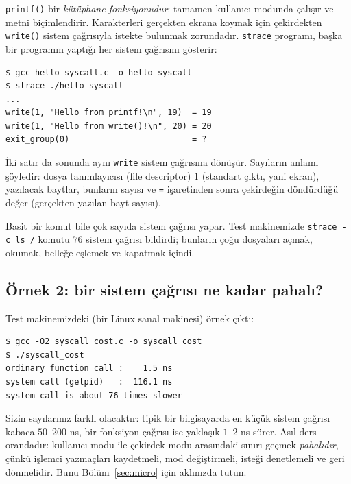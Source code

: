 \documentclass[11pt,a4paper]{article}
\newcommand{\cmd}[1]{\texttt{#1}}
\begin{document}


\cmd{printf()} bir \emph{kütüphane fonksiyonudur}: tamamen kullanıcı modunda çalışır ve metni biçimlendirir. Karakterleri gerçekten ekrana koymak için çekirdekten \cmd{write()} sistem çağrısıyla istekte bulunmak zorundadır. \cmd{strace} programı, başka bir programın yaptığı her sistem çağrısını gösterir:

\begin{lstlisting}[style=term]
$ gcc hello_syscall.c -o hello_syscall
$ strace ./hello_syscall
...
write(1, "Hello from printf!\n", 19)  = 19
write(1, "Hello from write()!\n", 20) = 20
exit_group(0)                         = ?
\end{lstlisting}

İki satır da sonunda aynı \cmd{write} sistem çağrısına dönüşür. Sayıların anlamı şöyledir: dosya tanımlayıcısı (file descriptor) $1$ (standart çıktı, yani ekran), yazılacak baytlar, bunların sayısı ve \texttt{=} işaretinden sonra çekirdeğin döndürdüğü değer (gerçekten yazılan bayt sayısı).

Basit bir komut bile çok sayıda sistem çağrısı yapar. Test makinemizde \cmd{strace -c ls /} komutu $76$ sistem çağrısı bildirdi; bunların çoğu dosyaları açmak, okumak, belleğe eşlemek ve kapatmak içindi.

\subsection{Örnek 2: bir sistem çağrısı ne kadar pahalı?}



Test makinemizdeki (bir Linux sanal makinesi) örnek çıktı:

\begin{lstlisting}[style=term]
$ gcc -O2 syscall_cost.c -o syscall_cost
$ ./syscall_cost
ordinary function call :    1.5 ns
system call (getpid)   :  116.1 ns
system call is about 76 times slower
\end{lstlisting}

Sizin sayılarınız farklı olacaktır: tipik bir bilgisayarda en küçük sistem çağrısı kabaca $50$--$200$ ns, bir fonksiyon çağrısı ise yaklaşık $1$--$2$ ns sürer. Asıl ders orandadır: kullanıcı modu ile çekirdek modu arasındaki sınırı geçmek \emph{pahalıdır}, çünkü işlemci yazmaçları kaydetmeli, mod değiştirmeli, isteği denetlemeli ve geri dönmelidir. Bunu Bölüm~\ref{sec:micro} için aklınızda tutun.
\end{document}
